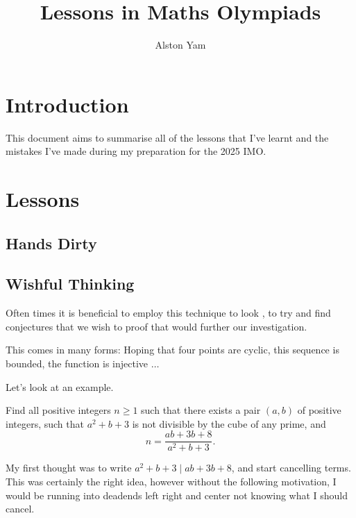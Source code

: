 \documentclass{article}
\title{Lessons in Maths Olympiads}
\author{Alston Yam}
\theoremstyle{mytheoremstyle}
\theoremstyle{mytheoremstyle}
\theoremstyle{myproblemstyle}
\theoremstyle{myproblemstyle}
\begin{document}
    \maketitle
    \parindent=0pt
    \section{Introduction}
    This document aims to summarise all of the lessons that I've learnt and the mistakes I've made during my preparation for the 2025 IMO.

    \section{Lessons}
    \subsection{Hands Dirty}

    \subsection{Wishful Thinking}
    \vspace{3pt}
    \begin{center}
    \end{center}

    Often times it is beneficial to employ this technique to look , to try and find conjectures that we wish to proof that would further our investigation.

    This comes in many forms: Hoping that four points are cyclic, this sequence is bounded, the function is injective $\dots$

    Let's look at an example.

    \begin{example}[2021 ISL N1]
        Find all positive integers $n\geq1$ such that there exists a pair $(a,b)$ of positive integers, such that $a^2+b+3$ is not divisible by the cube of any prime, and \[ n=\frac{ab+3b+8}{a^2+b+3}. \]
    \end{example}

    My first thought was to write $a^2 + b + 3 \mid ab + 3b + 8$, and start cancelling terms. This was certainly the right idea, however without the following motivation, I would be running into deadends left right and center not knowing what I should cancel.
    
    \begin{center}
    \end{center}
\end{document}
